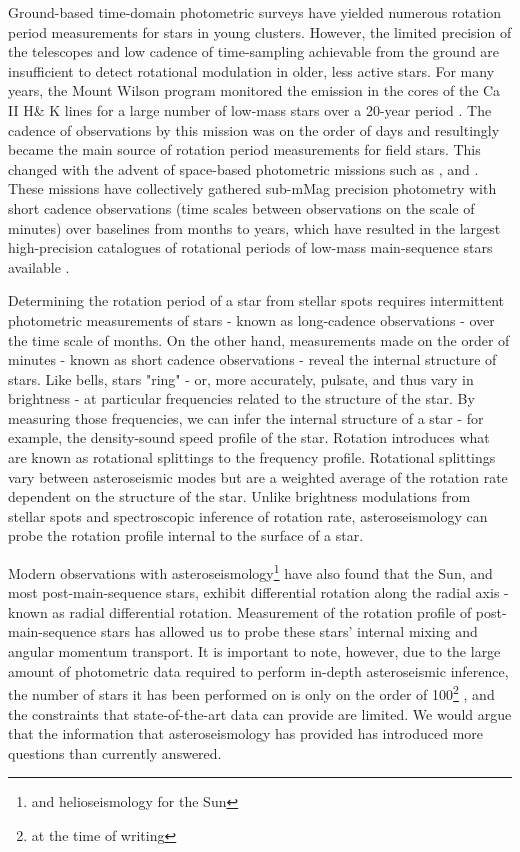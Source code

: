 Ground-based time-domain photometric surveys have yielded numerous rotation period measurements for stars in young clusters.
However, the limited precision of the telescopes and low cadence of time-sampling achievable from the ground are insufficient to detect rotational modulation in older, less active stars.
For many years, the Mount Wilson program monitored the emission in the cores of the Ca II H\& K lines for a large number of low-mass stars over a 20-year period \citep{wilson_probable_1963}.
The cadence of observations by this mission was on the order of days and resultingly became the main source of rotation period measurements for field stars.
This changed with the advent of space-based photometric missions such as \corot \citep{baglin_corot_2003}, \kepler \citep{borucki_kepler_2010, howell_k2_2014} and \tess \citep{ricker_transiting_2014}.
These missions have collectively gathered sub-mMag precision photometry with short cadence observations (time scales between observations on the scale of minutes) over baselines from months to years, which have resulted in the largest high-precision catalogues of rotational periods of low-mass main-sequence stars available \citep{mcquillan_rotation_2014}.

Determining the rotation period of a star from stellar spots requires intermittent photometric measurements of stars - known as long-cadence observations - over the time scale of months. 
On the other hand, measurements made on the order of minutes - known as short cadence observations - reveal the internal structure of stars.
Like bells, stars "ring" - or, more accurately, pulsate, and thus vary in brightness -  at particular frequencies related to the structure of the star.
By measuring those frequencies, we can infer the internal structure of a star - for example, the density-sound speed profile of the star.
Rotation introduces what are known as rotational splittings to the frequency profile.
Rotational splittings vary between asteroseismic modes but are a weighted average of the rotation rate dependent on the structure of the star. 
Unlike brightness modulations from stellar spots and spectroscopic inference of rotation rate, asteroseismology can probe the rotation profile internal to the surface of a star.

Modern observations with asteroseismology\footnote{and helioseismology for the Sun} have also found that the Sun, and most post-main-sequence stars, exhibit differential rotation along the radial axis - known as radial differential rotation.
Measurement of the rotation profile of post-main-sequence stars has allowed us to probe these stars' internal mixing and angular momentum transport. 
It is important to note, however, due to the large amount of photometric data required to perform in-depth asteroseismic inference, the number of stars it has been performed on is only on the order of 100\footnote{at the time of writing} \citep{li_asteroseismology_2020,li_asteroseismology_2020-1}, and the constraints that state-of-the-art data can provide are limited. We would argue that the information that asteroseismology has provided has introduced more questions than currently answered.

